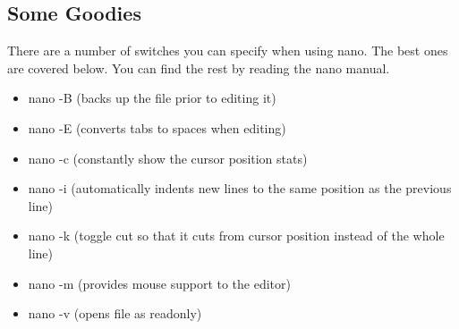 \subsection{Some Goodies}
\begin{information}
There are a number of switches you can specify when using nano. The best ones are covered below. You can find the rest by reading the nano manual.
\begin{itemize}
	\item nano -B (backs up the file prior to editing it)  
	\item nano -E (converts tabs to spaces when editing)
	\item nano -c (constantly show the cursor position stats)
	\item nano -i (automatically indents new lines to the same position as the previous line)
	\item nano -k (toggle cut so that it cuts from cursor position instead of the whole line)
	\item nano -m (provides mouse support to the editor)
	\item nano -v (opens file as readonly)
\end{itemize}
\end{information}


